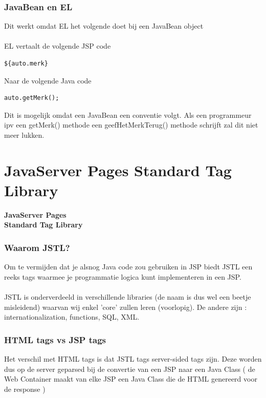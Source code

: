 \documentclass{beamer}
\begin{document}
\begin{frame}[fragile]

\frametitle{JavaBean en EL}

{\Large Dit werkt omdat EL het volgende doet bij een JavaBean object\\~\\

EL vertaalt de volgende JSP code 
\begin{verbatim}
${auto.merk}
\end{verbatim}
Naar de volgende Java code
\begin{verbatim}
auto.getMerk();
\end{verbatim}

Dit is mogelijk omdat een JavaBean een conventie volgt. Als een programmeur
ipv een getMerk() methode een geefHetMerkTerug() methode schrijft zal dit
niet meer lukken.}

\end{frame}


\section{JavaServer Pages Standard Tag Library}


\begin{frame}

\begin{center}
{\Huge \textbf{JavaServer Pages\\Standard Tag Library}}
\end{center}

\end{frame}


\begin{frame}

\frametitle{Waarom JSTL?}

{\Large Om te vermijden dat je alsnog Java code zou gebruiken in JSP biedt JSTL een
reeks tags waarmee je programmatie logica kunt implementeren in een JSP.\\~\\

JSTL is onderverdeeld in verschillende libraries (de naam is dus wel een beetje misleidend) waarvan wij enkel 'core' zullen leren (voorlopig). De andere zijn : internationalization, functions, SQL, XML.}

\end{frame}


\begin{frame}

\frametitle{HTML tags vs JSP tags}

{\Large Het verschil met HTML tags is dat JSTL tags server-sided tags zijn. Deze worden dus op de server geparsed bij de convertie van een JSP naar een Java Class ( de Web Container maakt van elke JSP een Java Class die de HTML genereerd voor de response )}

\end{frame}
\end{document}
